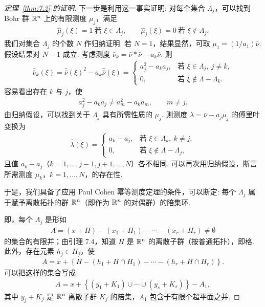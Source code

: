 \begin{proof}[定理~\ref{thm:7.2} 的证明]
下一步是利用这一事实证明: 对每个集合 $\Lambda_j$，可以找到 Bohr 群 $\mathbb{R}^n$ 上的有限测度 $\mu_j$，满足
\begin{align*}
  \widehat{\mu}_{j}(\xi)=1\ \text{若 } \xi\in\Lambda_{j},\qquad
  \widehat{\mu}_{j}(\xi)=0\ \text{若 } \xi\notin\Lambda_{j}.
\end{align*}
我们对集合 $\Lambda_j$ 的个数 $N$ 作归纳证明. 若 $N=1$，结果显然，可取 $\mu_1 = (1/a_1)\bar{\nu}$. 假设结果对 $N-1$ 成立. 考虑测度 $\bar{\nu}_k = \bar{\nu} * \bar{\nu} - a_k\bar{\nu}$. 则
\begin{align*}
  \widehat{\overline{\nu}}_{k}(\xi)
  =\widehat{\overline{\nu}}(\xi)^{2}-a_{k}\widehat{\overline{\nu}}(\xi)
  =\begin{cases}
    a_{j}^{2}-a_{k}a_{j}, & \text{若 } \xi\in\Lambda_{j},\ j\neq k,\\
    0, & \text{若 } \xi\notin\Lambda-\Lambda_{k}.
  \end{cases}
\end{align*}
容易看出存在 $k$ 与 $j$，使
\begin{align*}
  a_{j}^{2}-a_{k}a_{j}\neq a_{m}^{2}-a_{k}a_{m},\qquad m\neq j.
\end{align*}
由归纳假设，可以找到关于 $\Lambda_j$ 具有所需性质的 $\mu_j$. 则测度 $\lambda = \bar{\nu} - a_j\mu_j$ 的傅里叶变换为
\begin{align*}
  \widehat{\lambda}(\xi)=\begin{cases}
    a_{k}-a_{j}, & \text{若 } \xi\in\Lambda_{k},\ k\neq j,\\
    0, & \text{若 } \xi\notin\Lambda-\Lambda_{j},
  \end{cases}
\end{align*}
且值 $a_{k}-a_{j}$（$k=1,\ldots,j-1, j+1,\ldots,N$）各不相同. 可以再次用归纳假设，断言所需测度 $\mu_{k}$，$k=1,\ldots,N$，的存在性.

于是，我们具备了应用 Paul Cohen 幂等测度定理的条件，可以断定: 每个 $\Lambda_j$ 属于赋予离散拓扑的群 $\mathbb{R}^n$（即作为 $\mathbb{R}^n$ 的对偶群）的陪集环.

即，每个 $\Lambda_{j}$ 是形如
\begin{align*}
  A=\left(x+H\right)-\left(x_{1}+H_{1}\right)-\cdots-\left(x_{r}+H_{r}\right)\neq\emptyset
\end{align*}
的集合的有限并；由引理 7.4，知道 $H$ 是 $\mathbb{R}^n$ 的离散子群（按普通拓扑），即格. 此外，存在元素 $h_j \in H_j$，使
\begin{align*}
  A=x+\left\{H-\left(h_{1}+H\cap H_{1}\right)-\cdots-\left(h_{r}+H\cap H_{r}\right)\right\}.
\end{align*}
可以把这样的集合写成
\begin{align*}
  A=x+\left\{\left(y_{1}+K_{1}\right)\cup\cdots\cup\left(y_{s}+K_{s}\right)\right\}-A_{1},
\end{align*}
其中 $y_j + K_j$ 是 $\mathbb{R}^n$ 离散子群 $K_j$ 的陪集，$A_1$ 包含于有限个超平面之并.


\end{proof}
